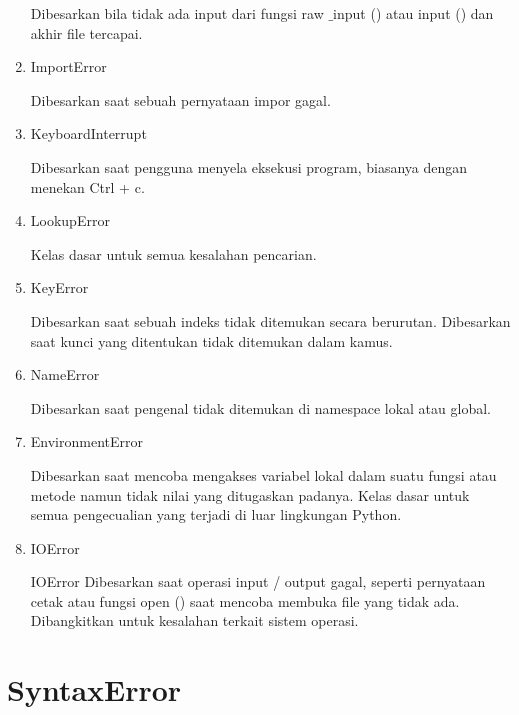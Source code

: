 \begin{enumerate}
Dibesarkan bila tidak ada input dari fungsi raw $  \_  $input () atau input () dan akhir file tercapai. 
\vspace{12pt}

\item ImportError 

Dibesarkan saat sebuah pernyataan impor gagal. 
\vspace{12pt}

\item KeyboardInterrupt  

Dibesarkan saat pengguna menyela eksekusi program, biasanya dengan menekan Ctrl + c. 
\vspace{12pt}

\item LookupError  

Kelas dasar untuk semua kesalahan pencarian. 
\vspace{12pt}


\item KeyError 
 
Dibesarkan saat sebuah indeks tidak ditemukan secara berurutan. Dibesarkan saat kunci yang ditentukan tidak ditemukan dalam kamus. 
\vspace{12pt}

\item NameError 

Dibesarkan saat pengenal tidak ditemukan di namespace lokal atau global. 
\vspace{12pt}



\item EnvironmentError  
 
Dibesarkan saat mencoba mengakses variabel lokal dalam suatu fungsi atau metode namun tidak nilai yang ditugaskan padanya. Kelas dasar untuk semua pengecualian yang terjadi di luar lingkungan Python. 
\vspace{12pt}


\item IOError 

IOError Dibesarkan saat operasi input / output gagal, seperti pernyataan cetak atau fungsi open () saat mencoba membuka file yang tidak ada. Dibangkitkan untuk kesalahan terkait sistem operasi. 
\vspace{12pt}

\end {enumerate}
 
\section{SyntaxError} 

